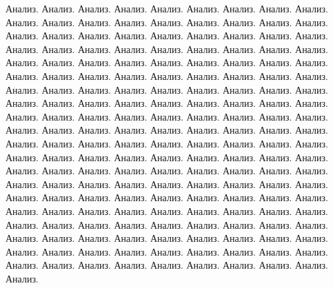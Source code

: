 Анализ. Анализ. Анализ. Анализ. Анализ. 
Анализ. Анализ. Анализ. Анализ. Анализ. Анализ. Анализ. Анализ. Анализ. Анализ. Анализ. 
Анализ. Анализ. Анализ. Анализ. Анализ. 
Анализ. Анализ. Анализ. Анализ. Анализ. Анализ. Анализ. Анализ. Анализ. Анализ. Анализ. 
Анализ. Анализ. Анализ. Анализ. Анализ. 
Анализ. Анализ. Анализ. Анализ. Анализ. Анализ. Анализ. Анализ. Анализ. Анализ. Анализ. 
Анализ. Анализ. Анализ. Анализ. Анализ. 
Анализ. Анализ. Анализ. Анализ. Анализ. Анализ. Анализ. Анализ. Анализ. Анализ. Анализ. 
Анализ. Анализ. Анализ. Анализ. Анализ. 
Анализ. Анализ. Анализ. Анализ. Анализ. Анализ. Анализ. Анализ. Анализ. Анализ. Анализ. 
Анализ. Анализ. Анализ. Анализ. Анализ. 
Анализ. Анализ. Анализ. Анализ. Анализ. Анализ. Анализ. Анализ. Анализ. Анализ. Анализ. 
Анализ. Анализ. Анализ. Анализ. Анализ. 
Анализ. Анализ. Анализ. Анализ. Анализ. Анализ. Анализ. Анализ. Анализ. Анализ. Анализ. 
Анализ. Анализ. Анализ. Анализ. Анализ. 
Анализ. Анализ. Анализ. Анализ. Анализ. Анализ. Анализ. Анализ. Анализ. Анализ. Анализ. 
Анализ. Анализ. Анализ. Анализ. Анализ. 
Анализ. Анализ. Анализ. Анализ. Анализ. Анализ. Анализ. Анализ. Анализ. Анализ. Анализ. 
Анализ. Анализ. Анализ. Анализ. Анализ. 
Анализ. Анализ. Анализ. Анализ. Анализ. Анализ. Анализ. Анализ. Анализ. Анализ. Анализ. 
Анализ. Анализ. Анализ. Анализ. Анализ. 
Анализ. Анализ. Анализ. Анализ. Анализ. Анализ. Анализ. Анализ. Анализ. Анализ. Анализ. 
Анализ. Анализ. Анализ. Анализ. Анализ. 

